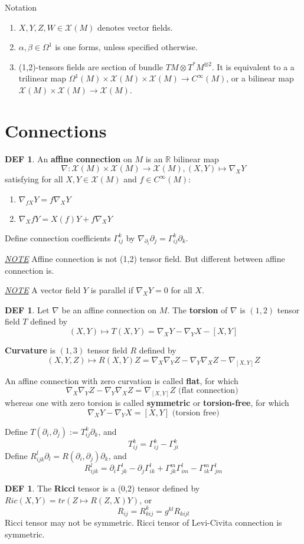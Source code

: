 \documentclass[twocolumn]{article}
\renewcommand{\emph}[1]{{\color{blue!70!black}\sffamily\bfseries #1}}
\newcommand{\X}{\mathscr{X}}
\newcommand{\n}{\nabla}
\newcommand{\R}{\mathbb{R}}
\newcommand{\C}{C^{\infty}}
\newcommand{\p}{\partial}
\newcommand{\G}{\Gamma}
\newcommand{\N}{\textit{\underline{NOTE} }}
\newcommand{\W}{\Omega}
\newcommand{\ot}{\otimes}
\theoremstyle{definition}
\newtheorem{defi}[thm]{DEF}
\begin{document}
\begin{fdefi}{Notation}{}
	\begin{enumerate}
		\item $X, Y, Z, W \in \X(M)$ denotes vector fields. 
		\item $\alpha, \beta \in \W^1$ is one forms, unless specified otherwise.
		\item (1,2)-tensors fields are section of bundle $TM \otimes T^{*}M^{\ot 2}$. 
		It is equivalent to a a trilinear map $\W^1(M) \times \X(M) \times \X(M) \rightarrow C^{\infty}(M)$, or a bilinear map $\X(M) \times \X(M) \to \X(M)$.
	\end{enumerate}
\end{fdefi}

\hrulefill
\section{Connections}

\begin{defi}
	An \emph{affine connection} on $M$ is an $\R$ bilinear map 
	$$
		\n: \X (M) \times \X(M) \to \X (M), (X,Y) \mapsto \n_X Y
	$$
	satisfying for all $X, Y \in \X(M)$ and $f \in \C(M)$: 
	\begin{enumerate}
		\item $\n_{fX} Y = f \n_X Y$
		\item $\n_{X} fY = X(f) Y + f \n_X Y$
	\end{enumerate}

	Define connection coefficients $\G^k_{ij}$ by $\n_{\p_i}\p_j = \G_{ij}^k \p_k$.
\end{defi}
\N Affine connection is not (1,2) tensor field. But different between affine connection is.

\N A vector field $Y$ is parallel if $\n_X Y = 0$ for all $X$.

\begin{defi}
	Let $\n$ be an affine connection on $M$.
	The \emph{torsion} of $\n$ is $(1,2)$ tensor field $T$ defined by
	$$
	(X, Y) \mapsto T(X, Y) = \n_X Y - \n_Y X - [X, Y]
	$$
	
	\emph{Curvature} is $(1,3)$ tensor field $R$ defined by
	$$
	(X,Y,Z) \mapsto R(X, Y)Z = \n_X \n_Y Z - \n_Y \n_X Z - \n_{[X, Y]} Z
	$$

	An affine connection with zero curvation is called \emph{flat}, for which
	$$
		\n_X \n_Y Z-  \n_Y \n_X Z = \n_{[X, Y]} Z \text{ (flat connection) }
	$$
	whereas one with zero torsion is called \emph{symmetric} or \emph{torsion-free}, for which
	$$
	\n_X Y - \n_Y X = [X, Y] \text{ (torsion free)}
	$$

	Define $ T(\p_i, \p_j) := T_{ij}^k \p_k$, and 
	$$T_{ij}^k = \G_{ij}^k - \G_{ji}^k$$
	Define $R_{ijk}^l \p_l = R(\p_i, \p_j)\p_k$, and 
	$$R_{ijk}^l = \p_i \G_{jk}^l - \p_j \G_{ik}^l + \G_{jk}^m\G_{im}^l - \G_{ik}^m \G_{jm}^l$$
\end{defi}
\begin{defi}
	The \emph{Ricci} tensor is a (0,2) tensor defined by $Ric(X,Y) = tr(Z \mapsto R(Z,X)Y)$, or 
	$$
	R_{ij} = R_{kij}^k = g^{kl} R_{kijl}
	$$
	Ricci tensor may not be symmetric. 
	Ricci tensor of Levi-Civita connection is symmetric.
\end{defi}
\end{document}
